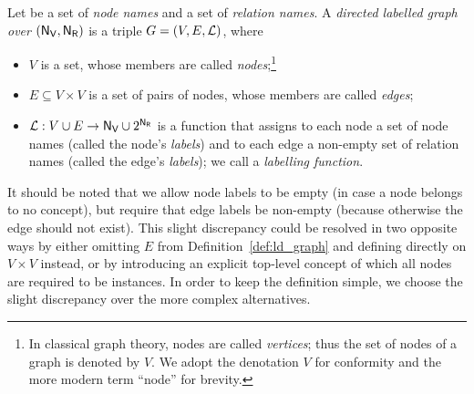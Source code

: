%
\begin{definition}
  \label{def:ld_graph}
  Let \NV be a set of \emph{node names} and \NR a set of \emph{relation names}.
  A \emph{directed labelled graph over $(\mathsf{N}_\mathsf{V},\mathsf{N}_\mathsf{R})$} is a triple $G = (V,E,\mathcal{L})$,
  where
  \begin{itemize}
    \item
    $V$ is a set, whose members are called \emph{nodes};\footnote{%
      In classical graph theory, nodes are called \emph{vertices}; thus the set of
      nodes of a graph is denoted by $V$. We adopt the denotation $V$ for conformity
      and the more modern term ``node'' for brevity.%
    }      
    \item 
    $E \subseteq V \times V$ is a set of pairs of nodes, whose members are called \emph{edges};
    \item
    $\mathcal{L} : V \cup E \to \mathsf{N}_\mathsf{V} \cup 2^{\mathsf{N}_\mathsf{R}}$ is a function that assigns 
    to each node a set of node names (called the node's \emph{labels}) and
    to each edge a non-empty set of relation names (called the edge's \emph{labels});
    we call \Lmc a \emph{labelling function}.
  \end{itemize}
\end{definition}
%
It should be noted that we allow node labels to be empty (in case a node belongs to no concept),
but require that edge labels be non-empty (because otherwise the edge should not exist).
This slight discrepancy could be resolved in two opposite ways by either omitting $E$ from Definition~\ref{def:ld_graph}
and defining \Lmc directly on $V \times V$ instead, or by introducing an explicit top-level concept
of which all nodes are required to be instances. In order to keep the definition simple,
we choose the slight discrepancy over the more complex alternatives.

